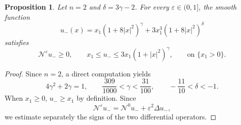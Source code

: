 \documentclass[11pt]{amsart}
\renewcommand{\leq}{\leqslant}
\renewcommand{\geq}{\geqslant}
\renewcommand{\ge}{>}
\newcommand{\eps}{\varepsilon}
\newcommand{\Ne}{\mathcal N^\eps}
\newtheorem{proposition}[theorem]{Proposition}
\theoremstyle{definition}
\theoremstyle{remark}
\numberwithin{equation}{section}
\begin{document}
\begin{proposition}\label{prop:barrier-lower-planar}
Let $n=2$ and $\delta=3\gamma-2$. For every $\eps\in(0,1]$, the smooth function
\[
 u_-(x)=x_1(1+8|x|^2)^\gamma+3x_1^3(1+8|x|^2)^\delta
\]
satisfies
\begin{equation}\label{subsoluzionejernfvojnttijvnrtvjnr}
   \Ne u_-\geq 0,\qquad x_1\leq u_-\leq 3x_1(1+|x|^2)^\gamma,  \qquad \text{on }\{x_1\ge 0\}.
\end{equation}
\end{proposition}
\begin{proof}
 Since $n=2$, a direct computation yields
\begin{equation}\label{eq_planar_exponent_bounds}
  4\gamma^2+2\gamma=1,\qquad \frac{309}{1000}<\gamma<\frac{31}{100},\qquad
 -\frac{11}{10}<\delta<-1.
\end{equation}
When $x_1\geq 0$, $u_-\geq x_1$ by definition.
Since 
\begin{equation}\label{splittingdeglioperatioriermerijn}
    \Ne u_-= \mathcal{N}^0u_-+ \eps^2 \Delta  u_-,
\end{equation}
we estimate separately the signs of the two differential operators.


\end{proof}
\end{document}

